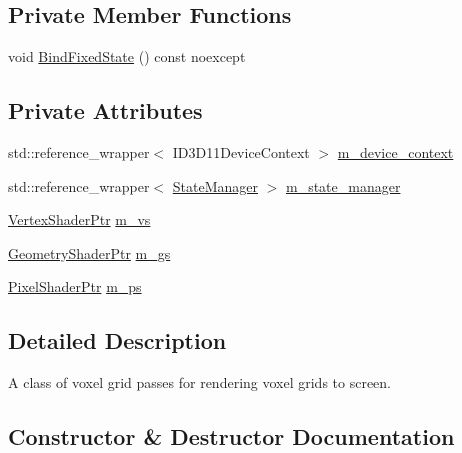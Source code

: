 \subsection*{Private Member Functions}
\begin{DoxyCompactItemize}
\item 
void \mbox{\hyperlink{classmage_1_1rendering_1_1_voxel_grid_pass_a38a3d6338eded537aab2ced5c486bdd4}{Bind\+Fixed\+State}} () const noexcept
\end{DoxyCompactItemize}
\subsection*{Private Attributes}
\begin{DoxyCompactItemize}
\item 
std\+::reference\+\_\+wrapper$<$ I\+D3\+D11\+Device\+Context $>$ \mbox{\hyperlink{classmage_1_1rendering_1_1_voxel_grid_pass_aaf8d84bbd6efe405a649b3ab643abefc}{m\+\_\+device\+\_\+context}}
\item 
std\+::reference\+\_\+wrapper$<$ \mbox{\hyperlink{classmage_1_1rendering_1_1_state_manager}{State\+Manager}} $>$ \mbox{\hyperlink{classmage_1_1rendering_1_1_voxel_grid_pass_ab1072fa557827f7e71f2094ce25f733e}{m\+\_\+state\+\_\+manager}}
\item 
\mbox{\hyperlink{namespacemage_1_1rendering_aaf704b9c54a4181f4950a1761de69dda}{Vertex\+Shader\+Ptr}} \mbox{\hyperlink{classmage_1_1rendering_1_1_voxel_grid_pass_a56d7195f315485c26ae690b1512a3c5e}{m\+\_\+vs}}
\item 
\mbox{\hyperlink{namespacemage_1_1rendering_aa5d63f80f9483d0896718813768ba1cf}{Geometry\+Shader\+Ptr}} \mbox{\hyperlink{classmage_1_1rendering_1_1_voxel_grid_pass_af94a1287d866d10b3dabb01a0f898eef}{m\+\_\+gs}}
\item 
\mbox{\hyperlink{namespacemage_1_1rendering_af03d922b228ee9c8542baaa2ecc9f259}{Pixel\+Shader\+Ptr}} \mbox{\hyperlink{classmage_1_1rendering_1_1_voxel_grid_pass_a19cb04ed26d43e59277ffef4039a051d}{m\+\_\+ps}}
\end{DoxyCompactItemize}


\subsection{Detailed Description}
A class of voxel grid passes for rendering voxel grids to screen. 

\subsection{Constructor \& Destructor Documentation}
\mbox{\label{classmage_1_1rendering_1_1_voxel_grid_pass_ad748e2aaccd4d34bcf5216815fe6d56f}} 
